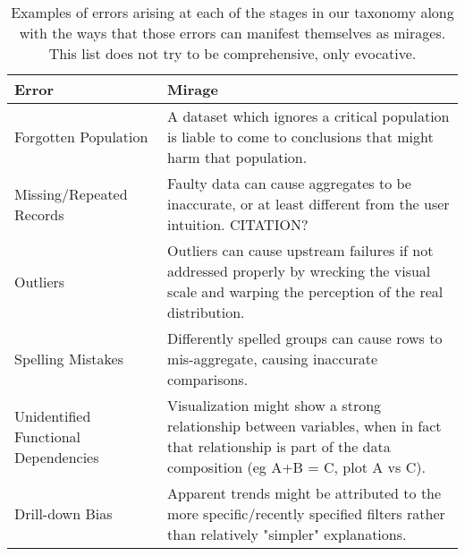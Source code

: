 
\begin{table*}[]
\centering
\caption{Examples of errors arising at each of the stages in our taxonomy along with the ways that those errors can manifest themselves as mirages. This list does not try to be comprehensive, only evocative.}
\small
\begin{tabular}{p{5cm}p{12cm}}
\normalsize{Error} & \normalsize{Mirage}\\ \hline
   \rowcolor{colora}\multirow{6}{0em}{\hspace{-0.6cm}\rotatebox{90}{\normalsize{Curating}}}Forgotten Population & A dataset which ignores a critical population is liable to come to conclusions that might harm that population. \cite{missingdatasets, correll2019ethical}\\
 \rowcolor{colora-opaque}Missing/Repeated Records & Faulty data can cause aggregates to be inaccurate, or at least different from the user intuition. \cite{kim2003taxonomy}  CITATION?\\
 \rowcolor{colora}Outliers & Outliers can cause upstream failures if not addressed properly by wrecking the visual scale and warping the perception of the real distribution.  \\
 \rowcolor{colora-opaque}Spelling Mistakes & Differently spelled groups can cause rows to mis-aggregate, causing inaccurate comparisons. \cite{wang2019uni}\\
 \rowcolor{colora}Unidentified Functional Dependencies & Visualization might show a strong relationship between variables, when in fact that relationship is part of the data composition (eg A+B = C, plot A vs C). \cite{wang2019uni}\\
 \rowcolor{colora-opaque}Drill-down Bias & Apparent trends might be attributed to the more specific/recently specified filters rather than relatively "simpler" explanations. \cite{lee2019avoiding}\\


\end{tabular}
\end{table*}
